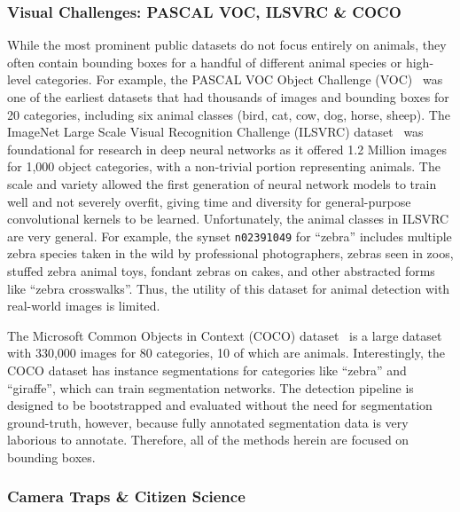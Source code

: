 \subsubsection{Visual Challenges: PASCAL VOC, ILSVRC \& COCO}

While the most prominent public datasets do not focus entirely on animals, they often contain bounding boxes for a handful of different animal species or high-level categories. For example, the PASCAL VOC Object Challenge (VOC)~\cite{everingham_pascal_2010} was one of the earliest datasets that had thousands of images and bounding boxes for 20 categories, including six animal classes (bird, cat, cow, dog, horse, sheep).  The ImageNet Large Scale Visual Recognition Challenge (ILSVRC) dataset~\cite{russakovsky_imagenet_2015} was foundational for research in deep neural networks as it offered 1.2 Million images for 1,000 object categories, with a non-trivial portion representing animals.  The scale and variety allowed the first generation of neural network models to train well and not severely overfit, giving time and diversity for general-purpose convolutional kernels to be learned.  Unfortunately, the animal classes in ILSVRC are very general.  For example, the synset \texttt{n02391049} for ``zebra'' includes multiple zebra species taken in the wild by professional photographers, zebras seen in zoos, stuffed zebra animal toys, fondant zebras on cakes, and other abstracted forms like ``zebra crosswalks''. Thus, the utility of this dataset for animal detection with real-world images is limited.

The Microsoft Common Objects in Context (COCO) dataset~\cite{lin_microsoft_2014} is a large dataset with 330,000 images for 80 categories, 10 of which are animals.  Interestingly, the COCO dataset has instance segmentations for categories like ``zebra'' and ``giraffe'', which can train segmentation networks.  The detection pipeline is designed to be bootstrapped and evaluated without the need for segmentation ground-truth, however, because fully annotated segmentation data is very laborious to annotate. Therefore, all of the methods herein are focused on bounding boxes.

\subsubsection{Camera Traps \& Citizen Science}

